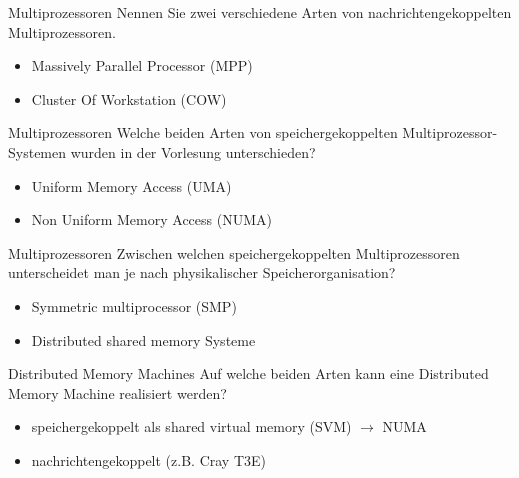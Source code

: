 \begin{aufgabe}{Multiprozessoren}
    Nennen Sie zwei verschiedene Arten von nachrichtengekoppelten Multiprozessoren.
    \tcblower
    \begin{itemize}
        \item Massively Parallel Processor (MPP)
        \item Cluster Of Workstation (COW)
    \end{itemize}
\end{aufgabe}

\begin{aufgabe}{Multiprozessoren}
    Welche beiden Arten von speichergekoppelten Multiprozessor-Systemen wurden in der Vorlesung unterschieden?
    \tcblower
    \begin{itemize}
        \item Uniform Memory Access (UMA)
        \item Non Uniform Memory Access (NUMA)
    \end{itemize}
\end{aufgabe}

\begin{aufgabe}{Multiprozessoren}
    Zwischen welchen speichergekoppelten Multiprozessoren unterscheidet man je nach physikalischer Speicherorganisation?
    \tcblower
    \begin{itemize}
        \item Symmetric multiprocessor (SMP)
        \item Distributed shared memory Systeme
    \end{itemize}
\end{aufgabe}

\begin{aufgabe}{Distributed Memory Machines}
    Auf welche beiden Arten kann eine Distributed Memory Machine realisiert werden?
    \tcblower
    \begin{itemize}
        \item speichergekoppelt als shared virtual memory (SVM) $\to$ NUMA
        \item nachrichtengekoppelt (z.B. Cray T3E)
    \end{itemize}
\end{aufgabe}

